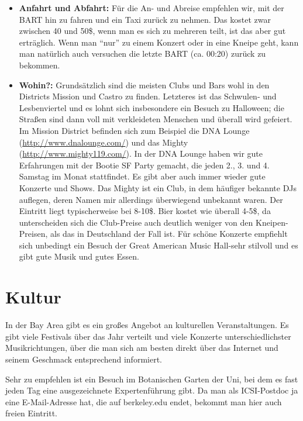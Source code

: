 \documentclass[a4paper]{scrreprt}
\begin{document}
\begin{itemize}

	\item \textbf{Anfahrt und Abfahrt:} Für die An- und Abreise empfehlen wir, mit der BART hin zu fahren und ein Taxi zurück zu nehmen. Das kostet zwar zwischen 40 und 50\$, wenn man es sich zu mehreren teilt, ist das aber gut erträglich. Wenn man "`nur"' zu einem Konzert oder in eine Kneipe geht, kann man natürlich auch versuchen die letzte BART (ca. 00:20) zurück zu bekommen.

	\item \textbf{Wohin?:} Grundsätzlich sind die meisten Clubs und Bars wohl in den Districts Mission und Castro zu finden. Letzteres ist das Schwulen- und Lesbenviertel und es lohnt sich insbesondere ein Besuch zu Halloween; die Straßen sind dann voll mit verkleideten Menschen und überall wird gefeiert. Im Mission District befinden sich zum Beispiel die DNA Lounge (\url{http://www.dnalounge.com/}) und das Mighty (\url{http://www.mighty119.com/}). In der DNA Lounge haben wir gute Erfahrungen mit der Bootie SF Party gemacht, die jeden 2., 3. und 4. Samstag im Monat stattfindet. Es gibt aber auch immer wieder gute Konzerte und Shows. Das Mighty ist ein Club, in dem häufiger bekannte DJs auflegen, deren Namen mir allerdings überwiegend unbekannt waren. Der Eintritt liegt typischerweise bei 8-10\$. Bier kostet wie überall 4-5\$, da unterscheiden sich die Club-Preise auch deutlich weniger von den Kneipen- Preisen, als das in Deutschland der Fall ist. Für schöne Konzerte empfiehlt sich unbedingt ein Besuch der Great American Music Hall-sehr stilvoll und es gibt gute Musik und gutes Essen.

\end{itemize}

\section{Kultur}

In der Bay Area gibt es ein großes Angebot an kulturellen Veranstaltungen. Es gibt viele Festivals über das Jahr verteilt und viele Konzerte unterschiedlichster Musikrichtungen, über die man sich am besten direkt über das Internet und seinem Geschmack entsprechend informiert.

Sehr zu empfehlen ist ein Besuch im Botanischen Garten der Uni, bei dem es fast jeden Tag eine ausgezeichnete Expertenführung gibt. Da man als ICSI-Postdoc ja eine E-Mail-Adresse hat, die auf berkeley.edu endet, bekommt man hier auch freien Eintritt.
\end{document}
